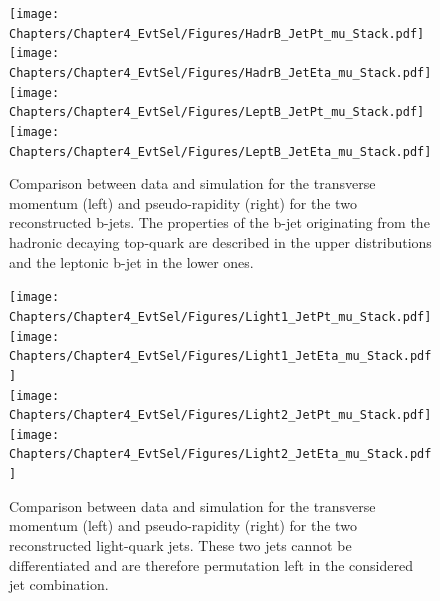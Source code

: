 \begin{figure}[h!tp]
 \centering
 \texttt{[image: Chapters/Chapter4\_EvtSel/Figures/HadrB\_JetPt\_mu\_Stack.pdf]} \hspace{0.2cm}
 \texttt{[image: Chapters/Chapter4\_EvtSel/Figures/HadrB\_JetEta\_mu\_Stack.pdf]}  \vspace{0.3cm} \\
 \texttt{[image: Chapters/Chapter4\_EvtSel/Figures/LeptB\_JetPt\_mu\_Stack.pdf]} \hspace{0.2cm}
 \texttt{[image: Chapters/Chapter4\_EvtSel/Figures/LeptB\_JetEta\_mu\_Stack.pdf]}
 \caption{Comparison between data and simulation for the transverse momentum (left) and pseudo-rapidity (right) for the two reconstructed b-jets. The properties of the b-jet originating from the hadronic decaying top-quark are described in the upper distributions and the leptonic b-jet in the lower ones.} \label{fig::MSPlotsBJets}
\end{figure}

\begin{figure}[h!tp]
 \centering
 \texttt{[image: Chapters/Chapter4\_EvtSel/Figures/Light1\_JetPt\_mu\_Stack.pdf]}  \hspace{0.2cm}
 \texttt{[image: Chapters/Chapter4\_EvtSel/Figures/Light1\_JetEta\_mu\_Stack.pdf]} \vspace{0.3cm} \\
 \texttt{[image: Chapters/Chapter4\_EvtSel/Figures/Light2\_JetPt\_mu\_Stack.pdf]}  \hspace{0.2cm}
 \texttt{[image: Chapters/Chapter4\_EvtSel/Figures/Light2\_JetEta\_mu\_Stack.pdf]}
 \caption{Comparison between data and simulation for the transverse momentum (left) and pseudo-rapidity (right) for the two reconstructed light-quark jets. These two jets cannot be differentiated and are therefore permutation left in the considered jet combination.} \label{fig::MSPlotsLights}
\end{figure}


